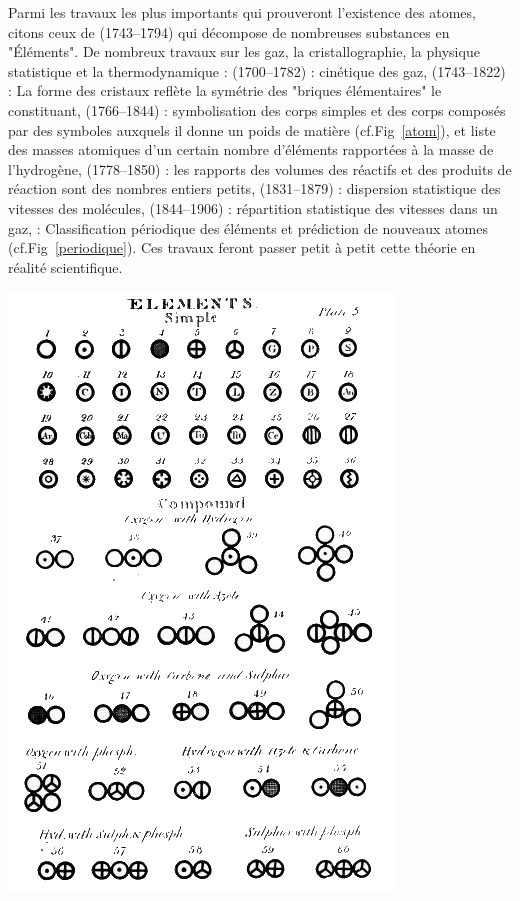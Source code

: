  Parmi les travaux les plus importants qui prouveront l'existence des atomes, citons ceux de  (\num{1743}--\num{1794}) qui décompose de nombreuses substances en "Éléments". De nombreux travaux sur les gaz, la cristallographie, la physique statistique et la thermodynamique :  (\num{1700}--\num{1782}) : cinétique des gaz,  (\num{1743}--\num{1822}) : La forme des cristaux reflète la symétrie des "briques élémentaires" le constituant,  (\num{1766}--\num{1844}) : symbolisation des corps simples et des corps composés par des symboles auxquels il donne un poids de matière (cf.Fig~\ref{atom}), et liste des masses atomiques d'un certain nombre d'éléments rapportées à la masse de l'hydrogène,  (\num{1778}--\num{1850}) : les rapports des volumes des réactifs et des produits de réaction sont des nombres entiers petits,  (\num{1831}--\num{1879}) : dispersion statistique des vitesses des molécules,  (\num{1844}--\num{1906}) : répartition statistique des vitesses dans un gaz,  : Classification périodique des éléments et prédiction de nouveaux atomes (cf.Fig~\ref{periodique}). Ces travaux feront passer petit à petit cette théorie en réalité scientifique. 
 
\marginpar
{
	\includegraphics[width=\marginparwidth]{SM/Dalton.png}
    \label{atom}
}

